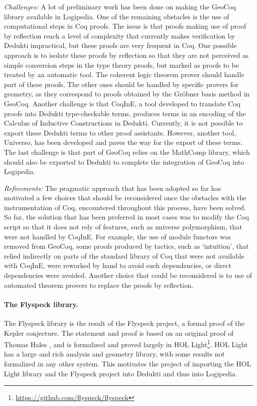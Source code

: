 \emph{Challenges:} A lot of preliminary work has been done on making the
GeoCoq library available in Logipedia.  One of the remaining obstacles is the use of
computational steps in Coq proofs. The issue is that proofs making use of
proof by reflection reach a level of complexity that currently makes
verification by Dedukti impractical, but these proofs are very
frequent in Coq.  One possible approach is to isolate these proofs by
reflection so that they are not perceived as simple conversion steps
in the type theory proofs, but marked as proofs to be treated by an
automatic tool. The coherent logic theorem prover should handle part
of these proofs. The other ones should be handled by specific provers
for geometry, as they correspond to proofs obtained by the Gr\"obner
basis method in GeoCoq.  Another challenge is that CoqInE, a tool
developed to translate Coq proofs into Dedukti type-checkable terms,
produces terms in an encoding of the Calculus of Inductive
Constructions in Dedukti. Currently, it is not possible to export these
Dedukti terms to other proof assistants. However, another tool,
Universo, has been developed and paves the way for the export of these
terms.  The last challenge is that part of GeoCoq relies on the
MathComp library, which should also be exported to Dedukti to complete
the integration of GeoCoq into Logipedia.

\emph{Refinements:}
The pragmatic approach that has been adopted so far has motivated a
few choices that should be reconsidered once the obstacles with the instrumentation of Coq,
encountered throughout this process, have been solved. So far, the solution that
has been preferred in most cases was to modify the Coq script so that
it does not rely of features, such as universe polymorphism, that were
not handled by CoqInE. For
example, the use of module functors was removed from GeoCoq, some
proofs produced by tactics, such as `intuition', that relied indirectly on
parts of the standard library of Coq that were not available with
CoqInE, were reworked by hand to avoid such dependencies, or direct
dependencies were avoided. Another choice that could be reconsidered
is to use of automated theorem provers to replace the proofs by reflection.

\paragraph*{The Flyspeck library.}

The Flyspeck library
is the result of the Flyspeck
project, a formal proof of the Kepler conjecture. The statement and
proof is based on an original proof of Thomas Hales
\cite{DBLP:journals/corr/HalesABDHHKMMNNNOPRSTTTUVZ15}, and is
formalized and proved largely in HOL
Light\footnote{\url{https://github.com/flyspeck/flyspeck}}. HOL Light
has a large and rich analysis and geometry library, with some results
not formalized in any other system. This motivates the project of
importing the HOL Light library and the Flyspeck project into
Dedukti and thus into Logipedia.

